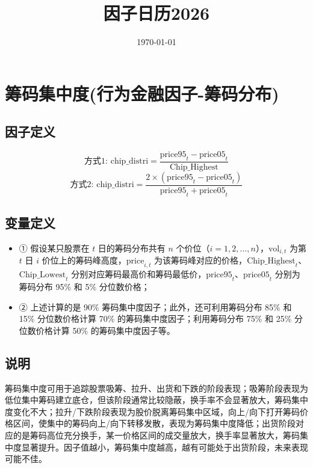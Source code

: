 \documentclass{article}
\title{因子日历2026}
\date{\today}
\begin{document}
\maketitle

\section{筹码集中度(行为金融因子-筹码分布)}

\subsection{因子定义}
\begin{equation}
    \text{方式1: } \mathrm{chip\_distri} = \frac{\mathrm{price95}_t - \mathrm{price05}_t}{\mathrm{Chip\_Highest}}
\end{equation}
\begin{equation}
    \text{方式2: } \mathrm{chip\_distri} = \frac{2 \times (\mathrm{price95}_t - \mathrm{price05}_t)}{\mathrm{price95}_t + \mathrm{price05}_t}
\end{equation}

\subsection{变量定义}
\begin{itemize}
    \item ① 假设某只股票在 \( t \) 日的筹码分布共有 \( n \) 个价位（\( i = 1, 2, \ldots, n \)），\( \mathrm{vol}_{i,t} \) 为第 \( t \) 日 \( i \) 价位上的筹码峰高度，\( \mathrm{price}_{i,t} \) 为该筹码峰对应的价格，\( \mathrm{Chip\_Highest}_t \)、\( \mathrm{Chip\_Lowest}_t \) 分别对应筹码最高价和筹码最低价，\( \mathrm{price95}_t \)、\( \mathrm{price05}_t \) 分别为筹码分布 95\% 和 5\% 分位数价格；
    \item ② 上述计算的是 90\% 筹码集中度因子；此外，还可利用筹码分布 85\% 和 15\% 分位数价格计算 70\% 的筹码集中度因子；利用筹码分布 75\% 和 25\% 分位数价格计算 50\% 的筹码集中度因子等。
\end{itemize}

\subsection{说明}
筹码集中度可用于追踪股票吸筹、拉升、出货和下跌的阶段表现；吸筹阶段表现为低位集中筹码建立底仓，但该阶段通常比较隐蔽，换手率不会显著放大，筹码集中度变化不大；拉升/下跌阶段表现为股价脱离筹码集中区域，向上/向下打开筹码价格区间，使集中的筹码向上/向下转移发散，表现为筹码集中度降低；出货阶段对应的是筹码高位充分换手，某一价格区间的成交量放大，换手率显著放大，筹码集中度显著提升。因子值越小，筹码集中度越高，越有可能处于出货阶段，未来表现可能不佳。
\end{document}
